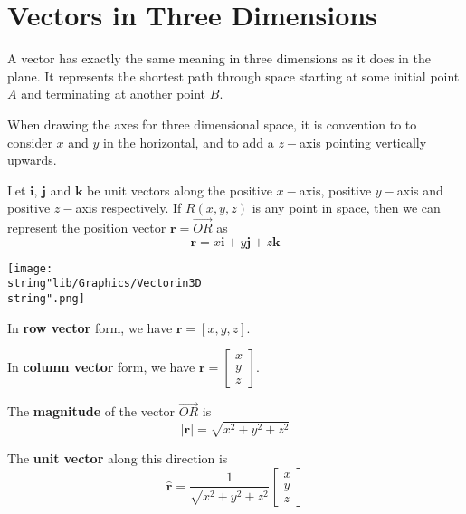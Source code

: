 \documentclass[11pt,a4paper]{book}
\begin{document}
\section{Vectors in Three Dimensions}

A vector has exactly the same meaning in three dimensions as it does
in the plane. It represents the shortest path through space starting
at some initial point $A$ and terminating at another point $B$.

When drawing the axes for three dimensional space, it is convention
to to consider $x$ and $y$ in the horizontal, and to add a $z-$axis
pointing vertically upwards.

Let $\textbf{i}$, $\textbf{j}$ and $\textbf{k}$ be unit vectors
along the positive $x-$axis, positive $y-$axis and positive $z-$axis
respectively. If $R\left(x,y,z\right)$ is any point in space, then
we can represent the position vector $\textbf{r}=\overrightarrow{OR}$
as
\[
\textbf{r}=x\textbf{i}+y\textbf{j}+z\textbf{k}
\]

\begin{minipage}[t]{0.55\textwidth}
\begin{center}
\texttt{[image: \\string"lib/Graphics/Vectorin3D\\string".png]}
\par\end{center}

\end{minipage}
\begin{minipage}[t]{0.50\textwidth}

\begin{tcolorbox}[colback=blue!5, colframe=black, boxrule=.4pt, sharpish corners]

In \textbf{row vector} form, we have $\textbf{r}=\left[x,y,z\right]$.

In \textbf{column vector} form, we have $\textbf{r}=\begin{bmatrix}x\\
y\\
z
\end{bmatrix}$.

The \textbf{magnitude} of the vector $\overrightarrow{OR}$ is
\[
\left|\textbf{r}\right|=\sqrt{x^{2}+y^{2}+z^{2}}
\]

The \textbf{unit vector} along this direction is
\[
\hat{\textbf{r}}=\frac{1}{\sqrt{x^{2}+y^{2}+z^{2}}}\begin{bmatrix}x\\
y\\
z
\end{bmatrix}
\]
\end{tcolorbox}

\end{minipage}
\end{document}
